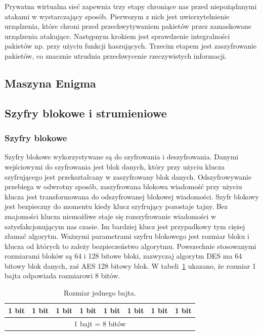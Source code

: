 \documentclass[12p]{article}
\begin{document}
\begin{itemize}
\quad Prywatna wirtualna sieć zapewnia trzy etapy chroniące nas przed niepożądanymi atakami w wystarczający sposób. Pierwszym z nich jest uwierzytelnienie urządzenia, które chroni przed przechwytywaniem pakietów przez zamaskowane urządzenia atakujące. Następnym krokiem jest sprawdzenie integralności pakietów np. przy użyciu funkcji haszujących. Trzecim etapem jest zaszyfrowanie pakietów, co znacznie utrudnia przechwycenie rzeczywistych informacji.
\end{itemize}


\subsection{Maszyna Enigma}

\subsection{Szyfry blokowe i strumieniowe}
\subsubsection{Szyfry blokowe} 
\quad Szyfry blokowe wykorzystywane są do szyfrowania i deszyfrowania. Danymi wejściowymi do szyfrowania jest blok danych, który przy użyciu klucza szyfrującego jest przekształcany w zaszyfrowany blok danych. Odszyfrowywanie przebiega w odwrotny sposób, zaszyfrowana blokowa wiadomość przy użyciu klucza jest transformowana do odszyfrowanej blokowej wiadomości. Szyfr blokowy jest bezpieczny do momentu kiedy klucz szyfrujący pozostaje tajny. Bez znajomości klucza niemożliwe staje się rozszyfrowanie wiadomości w satysfakcjonującym nas czasie. Im bardziej klucz jest przypadkowy tym ciężej złamać algorytm. Ważnymi parametrami szyfru blokowego jest rozmiar bloku i klucza od których to zależy bezpieczeństwo algorytmu. Powszechnie stosowanymi rozmiarami bloków są 64 i 128 bitowe bloki, zazwyczaj algorytm DES ma 64 bitowy blok danych, zaś AES 128 bitowy blok. W tabeli~\ref{bajt} ukazano, że rozmiar 1 bajta odpowiada rozmiarowi 8 bitów.
\begin{table}[h]
\centering
\begin{tabular}{|r|r|r|c|c|l|l|l|}
\hline
1 bit & 1 bit & 1 bit & 1 bit & 1 bit & 1 bit & 1 bit & 1 bit\\
\hline
\multicolumn{8}{|c|}{1 bajt = 8 bitów}\\
\hline
\end{tabular}
\caption{Rozmiar jednego bajta.}\label{bajt}
\end{table}
\end{document}
